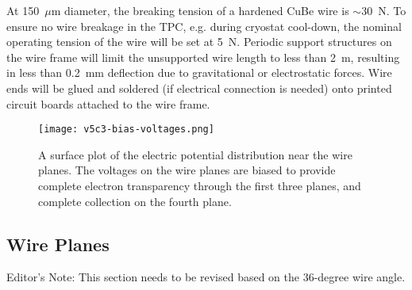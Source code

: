 At 150~$\mu$m diameter,  the breaking tension of a hardened CuBe wire is $\sim$30~N.  
To ensure no wire breakage in the TPC, e.g. during cryostat cool-down, the nominal operating tension of the wire will be set at 5~N.  Periodic support structures on the wire frame will
limit the unsupported wire length to less than 2~m, resulting in less than 0.2~mm deflection due to gravitational or electrostatic forces.  Wire ends will be glued and soldered (if electrical connection is needed) 
onto printed circuit boards attached to the wire frame.

\begin{figure}[htbp]
\centering
\texttt{[image: v5c3-bias-voltages.png]}
\caption[Plot of electric potential distribution near the wire planes]{A surface plot of the electric potential distribution near the wire planes.  The voltages on the wire planes are biased to provide complete electron transparency through the first three planes, and complete collection on the fourth plane. }
\label{fig:tpc-bias-voltages}
\end{figure}

\subsection{Wire Planes}

\begin{editornote}
Editor's Note: This section needs to be revised based on the 36-degree wire angle.  
\end{editornote}

